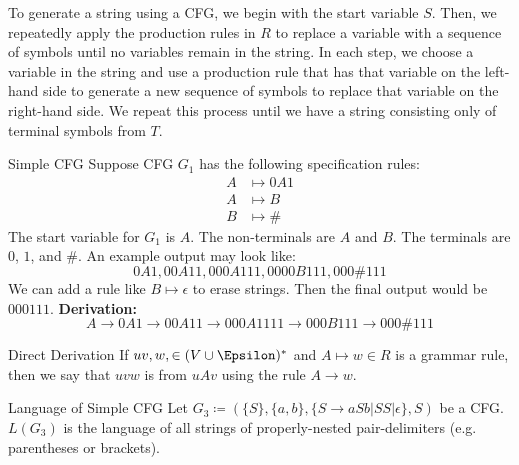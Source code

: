 \documentclass[math]{amznotes}
\begin{document}
To generate a string using a CFG, we begin with the start variable $S$. Then, we repeatedly apply the production rules in $R$ to replace a variable with a sequence of symbols until no variables remain in the string. In each step, we choose a variable in the string and use a production rule that has that variable on the left-hand side to generate a new sequence of symbols to replace that variable on the right-hand side. We repeat this process until we have a string consisting only of terminal symbols from $T$.


\begin{exbox}{Simple CFG}{}
    Suppose CFG $G_1$ has the following specification rules:
    \begin{align*}
        A &\mapsto 0A1 \\
        A &\mapsto B \\
        B &\mapsto \#
    \end{align*}
    The start variable for $G_1$ is $A$. The non-terminals are $A$ and $B$. The terminals are $0$, $1$, and $\#$. An example output may look like:
    \[ 0A1, 00A11, 000A111, 0000B111, 000\#111 \]
    We can add a rule like $B \mapsto \epsilon$ to erase strings. Then the final output would be $000111$.
    \tcblower
    \textbf{Derivation:}
    \[ A \to 0A1 \to 00A11 \to 000A1111 \to 000B111 \to 000\#111 \]
\end{exbox}

\begin{dfnbox}{Direct Derivation}{}
    If $uv,w, \in (V \cup \Epsilon)^*$ and $A \mapsto w \in R$ is a grammar rule, then we say that $uvw$ is  from $uAv$ using the rule $A \to w$.
\end{dfnbox}

\begin{exbox}{Language of Simple CFG}{}
    Let $G_3 \coloneq (\{S\}, \{a,b\}, \{S \to aSb | SS | \epsilon\}, S)$ be a CFG. $L(G_3)$ is the language of all strings of properly-nested pair-delimiters (e.g. parentheses or brackets).
\end{exbox}
\end{document}
